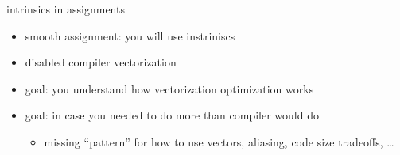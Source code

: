 \begin{frame}{intrinsics in assignments}
    \begin{itemize}
    \item smooth assignment: you will use instriniscs
    \item disabled compiler vectorization
    \vspace{.5cm}
    \item goal: you understand how vectorization optimization works
    \item goal: in case you needed to do more than compiler would do
        \begin{itemize}
        \item missing ``pattern'' for how to use vectors, aliasing, code size tradeoffs, \ldots
        \end{itemize}
    \end{itemize}
\end{frame}

